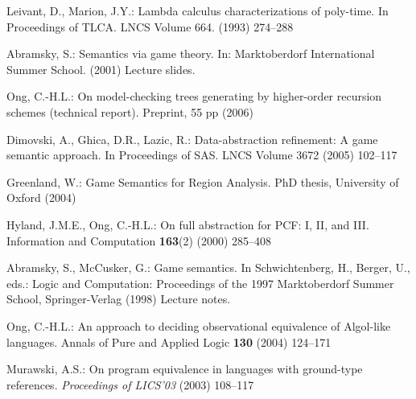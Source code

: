 \documentclass{llncs}
\begin{document}
\begin{thebibliography}{10}
Leivant, D., Marion, J.Y.:
\newblock Lambda calculus characterizations of poly-time.
\newblock In Proceedings of TLCA. LNCS Volume 664. (1993)  274--288

Abramsky, S.:
\newblock Semantics via game theory.
\newblock In: Marktoberdorf International Summer School. (2001) Lecture slides.

Ong, C.-H.L.:
\newblock On model-checking trees generating by higher-order recursion schemes
  (technical report).
\newblock Preprint, 55 pp (2006)

Dimovski, A., Ghica, D.R., Lazic, R.:
\newblock Data-abstraction refinement: A game semantic approach.
\newblock In Proceedings of SAS. LNCS Volume 3672 (2005)  102--117

Greenland, W.:
\newblock Game Semantics for Region Analysis.
\newblock PhD thesis, University of Oxford (2004)

Hyland, J.M.E., Ong, C.-H.L.:
\newblock On full abstraction for {PCF}: {I, II, and III}.
\newblock Information and Computation \textbf{163}(2) (2000)  285--408

Abramsky, S., McCusker, G.:
\newblock Game semantics.
\newblock In Schwichtenberg, H., Berger, U., eds.: Logic and Computation:
  Proceedings of the 1997 Marktoberdorf Summer School, Springer-Verlag (1998)
  Lecture notes.


Ong, C.-H.L.:
\newblock An approach to deciding observational equivalence of Algol-like languages.
\newblock Annals of Pure and Applied Logic \textbf{130} (2004)  124--171

Murawski, A.S.:
\newblock On program equivalence in languages with ground-type references.
\newblock \emph{Proceedings of LICS'03} (2003) 108--117
\end{thebibliography}
\end{document}
